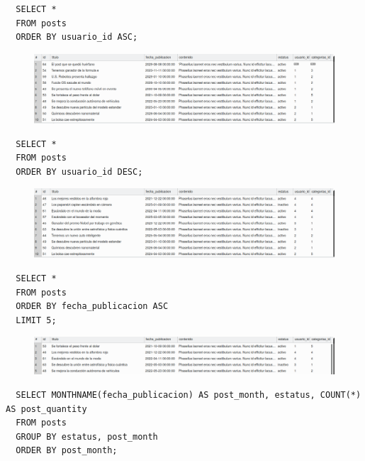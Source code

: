 \documentclass{article}
\begin{document}
\begin{verbatim}
  SELECT *
  FROM posts
  ORDER BY usuario_id ASC;
\end{verbatim}

\begin{figure}[h!]
  \centering
  \includegraphics[scale=0.5]{./Pictures/127_order_by_id_asc.png}
\end{figure}

\begin{verbatim}
  SELECT *
  FROM posts
  ORDER BY usuario_id DESC;
\end{verbatim}

\newpage

\begin{figure}[h!]
  \centering
  \includegraphics[scale=0.5]{./Pictures/128_order_by_id_desc.png}
\end{figure}

\begin{verbatim}
  SELECT *
  FROM posts
  ORDER BY fecha_publicacion ASC
  LIMIT 5;
\end{verbatim}

\begin{figure}[h!]
  \centering
  \includegraphics[scale=0.5]{./Pictures/129_order_by_limit.png}
\end{figure}

\begin{verbatim}
  SELECT MONTHNAME(fecha_publicacion) AS post_month, estatus, COUNT(*) AS post_quantity
  FROM posts
  GROUP BY estatus, post_month
  ORDER BY post_month;
\end{verbatim}
\end{document}
